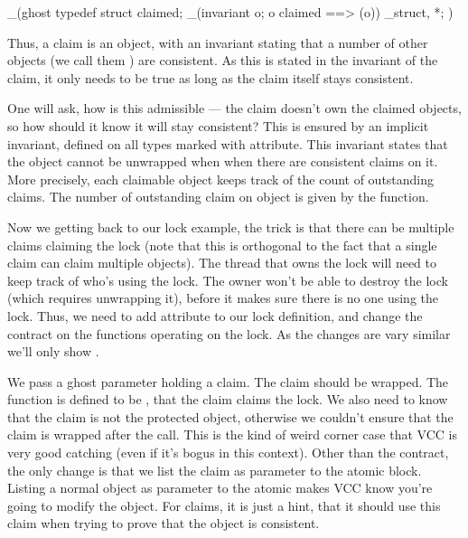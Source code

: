 \begin{VCC}
_(ghost 
typedef struct {
  \ptrset claimed;
  _(invariant \forall \object o; o \in claimed ==> \consistent(o))
} \claim_struct, *\claim;
)
\end{VCC}

\noindent
Thus, a claim is an object, with an invariant stating that a number of other objects
(we call them ) are consistent.
As this is stated in the invariant of the claim, it only needs to be true
as long as the claim itself stays consistent.

One will ask, how is this admissible
--- the claim doesn't own the claimed
objects, so how should it know it will stay consistent?
This is ensured by an implicit invariant, defined on all types
marked with  attribute.
This invariant states that the object cannot be unwrapped when
when there are consistent claims on it.
More precisely, each claimable object keeps track of the count of outstanding
claims.
The number of outstanding claim on object  is given by
the  function.

Now we getting back to our lock example, the trick is that there can be
multiple claims claiming the lock (note that this is orthogonal to
the fact that a single claim can claim multiple objects).
The thread that owns the lock will need to keep track of who's using
the lock.
The owner won't be able to destroy the lock (which requires unwrapping it),
before it makes sure there is no one using the lock.
Thus, we need to add  attribute to our lock
definition, and change the contract on the functions operating
on the lock. As the changes are vary similar we'll only
show .


\noindent
We pass a ghost parameter holding a claim.
The claim should be wrapped.
The function  is defined to be
, \ie that the claim claims the lock.
We also need to know that the claim is not the protected object,
otherwise we couldn't ensure that the claim is wrapped after the call.
This is the kind of weird corner case that VCC is very good catching
(even if it's bogus in this context).
Other than the contract, the only change is that we list the claim
as parameter to the atomic block.
Listing a normal object as parameter to the atomic makes VCC know you're
going to modify the object.
For claims, it is just a hint, that it should use this claim when trying
to prove that the object is consistent.

